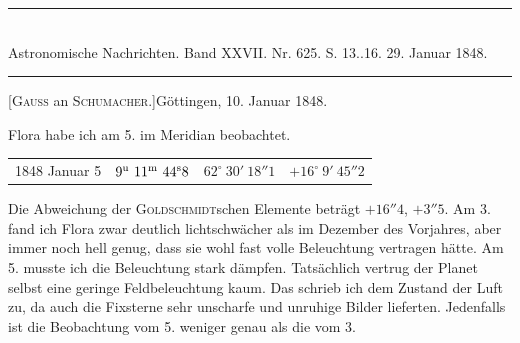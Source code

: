 \clearpage
\hypertarget{native-481-january10}{}
\begin{center}
\rule{0.55\linewidth}{0.4pt}\\[2pt]
Astronomische Nachrichten. Band XXVII. Nr. 625. S. 13..16. 29. Januar 1848.\\[2pt]
\rule{0.55\linewidth}{0.4pt}
\end{center}
\begin{center}[\textsc{Gauss} an \textsc{Schumacher}.]\quad Göttingen, 10. Januar 1848.\end{center}

Flora habe ich am 5. im Meridian beobachtet.

\begin{center}
\setlength{\tabcolsep}{4pt}
\begin{tabular}{l|r|r|r}
1848 Januar 5 & $9^{\rm u}\ 11^{\rm m}\ 44^{\rm s}8$ & $62^\circ\ 30'\ 18''1$ & $+16^\circ\ 9'\ 45''2$ \\
\end{tabular}
\end{center}

Die Abweichung der \textsc{Goldschmidt}schen Elemente beträgt $+16''4$, $+3''5$. Am 3. fand ich Flora zwar deutlich lichtschwächer als im Dezember des Vorjahres, aber immer noch hell genug, dass sie wohl fast volle Beleuchtung vertragen hätte. Am 5. musste ich die Beleuchtung stark dämpfen. Tatsächlich vertrug der Planet selbst eine geringe Feldbeleuchtung kaum. Das schrieb ich dem Zustand der Luft zu, da auch die Fixsterne sehr unscharfe und unruhige Bilder lieferten. Jedenfalls ist die Beobachtung vom 5. weniger genau als die vom 3.

